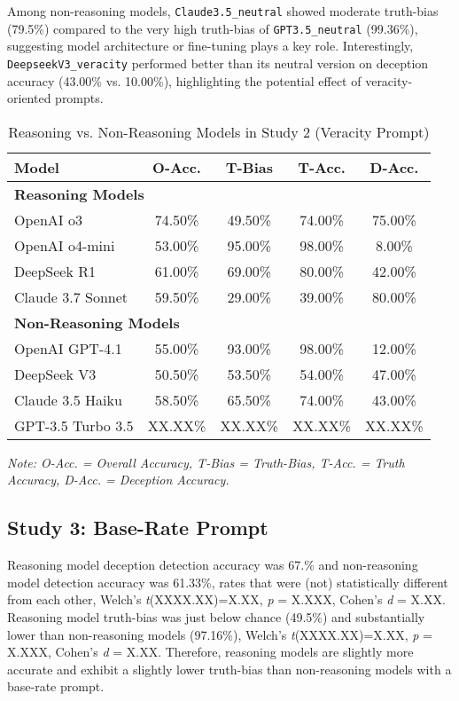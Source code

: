 \documentclass{article}
\begin{document}
Among non-reasoning models, \texttt{Claude3.5\_neutral} showed moderate truth-bias (79.5\%) compared to the very high truth-bias of \texttt{GPT3.5\_neutral} (99.36\%), suggesting model architecture or fine-tuning plays a key role. Interestingly, \texttt{DeepseekV3\_veracity} performed better than its neutral version on deception accuracy (43.00\% vs. 10.00\%), highlighting the potential effect of veracity-oriented prompts.

\begin{table}[ht]
\centering
\caption{Reasoning vs. Non-Reasoning Models in Study 2 (Veracity Prompt)}
\begin{tabular}{lcccc}
\toprule
\textbf{Model} & \textbf{O-Acc.} & \textbf{T-Bias} & \textbf{T-Acc.} & \textbf{D-Acc.} \\
\midrule
\multicolumn{5}{l}{\textbf{Reasoning Models}} \\
OpenAI o3 & 74.50\% & 49.50\% & 74.00\% & 75.00\% \\
OpenAI o4-mini & 53.00\% & 95.00\% & 98.00\% & 8.00\% \\
DeepSeek R1 & 61.00\% & 69.00\% & 80.00\% & 42.00\% \\
Claude 3.7 Sonnet & 59.50\% & 29.00\% & 39.00\% & 80.00\% \\
\midrule
\multicolumn{5}{l}{\textbf{Non-Reasoning Models}} \\
OpenAI GPT-4.1 & 55.00\% & 93.00\% & 98.00\% & 12.00\% \\
DeepSeek V3 & 50.50\% & 53.50\% & 54.00\% & 47.00\% \\
Claude 3.5 Haiku & 58.50\% & 65.50\% & 74.00\% & 43.00\% \\
GPT-3.5 Turbo 3.5 & XX.XX\% & XX.XX\% & XX.XX\% & XX.XX\% \\
\bottomrule
\end{tabular}
\begin{minipage}{0.7\linewidth}
\vspace{0.05in}
\footnotesize
\textit{Note: O-Acc. = Overall Accuracy, T-Bias = Truth-Bias, T-Acc. = Truth Accuracy, D-Acc. = Deception Accuracy.}
\end{minipage}
\label{tab:study1_model_comparison}
\end{table}

\subsection{Study 3: Base-Rate Prompt}

Reasoning model deception detection accuracy was 67.\% and non-reasoning model detection accuracy was 61.33\%, rates that were (not) statistically different from each other, Welch's \textit{t}(XXXX.XX)=X.XX, \textit{p} = X.XXX, Cohen's \textit{d} = X.XX. Reasoning model truth-bias was just below chance (49.5\%) and substantially lower than non-reasoning models (97.16\%), Welch's \textit{t}(XXXX.XX)=X.XX, \textit{p} = X.XXX, Cohen's \textit{d} = X.XX. Therefore, reasoning models are slightly more accurate and exhibit a slightly lower truth-bias than non-reasoning models with a base-rate prompt.
\end{document}
